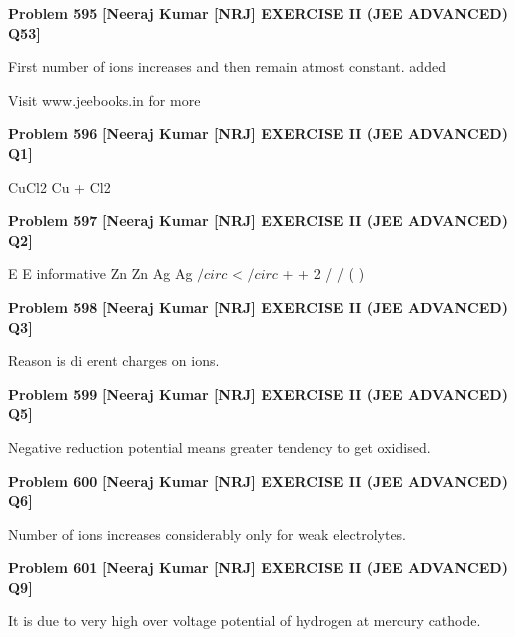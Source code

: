 \begin{problembox}
\textbf{Problem 595} \hfill \textbf{[Neeraj Kumar [NRJ] EXERCISE II (JEE ADVANCED) Q53]}
\label{q:ext-nrj_all_questions-595}

First number of ions increases and then remain 
atmost constant.
added
 
 
Visit www.jeebooks.in for more
\end{problembox}

\begin{problembox}
\textbf{Problem 596} \hfill \textbf{[Neeraj Kumar [NRJ] EXERCISE II (JEE ADVANCED) Q1]}
\label{q:ext-nrj_all_questions-596}

CuCl2 
 Cu + Cl2
\end{problembox}

\begin{problembox}
\textbf{Problem 597} \hfill \textbf{[Neeraj Kumar [NRJ] EXERCISE II (JEE ADVANCED) Q2]}
\label{q:ext-nrj_all_questions-597}

E
E
informative
Zn
Zn
Ag
Ag
$/circ$
<
$/circ$
+
+
2 /
/
(
)
\end{problembox}

\begin{problembox}
\textbf{Problem 598} \hfill \textbf{[Neeraj Kumar [NRJ] EXERCISE II (JEE ADVANCED) Q3]}
\label{q:ext-nrj_all_questions-598}

Reason is di  erent charges on ions.
\end{problembox}

\begin{problembox}
\textbf{Problem 599} \hfill \textbf{[Neeraj Kumar [NRJ] EXERCISE II (JEE ADVANCED) Q5]}
\label{q:ext-nrj_all_questions-599}

Negative reduction potential means greater 
tendency to get oxidised.
\end{problembox}

\begin{problembox}
\textbf{Problem 600} \hfill \textbf{[Neeraj Kumar [NRJ] EXERCISE II (JEE ADVANCED) Q6]}
\label{q:ext-nrj_all_questions-600}

Number of ions increases considerably only for 
weak electrolytes.
\end{problembox}

\begin{problembox}
\textbf{Problem 601} \hfill \textbf{[Neeraj Kumar [NRJ] EXERCISE II (JEE ADVANCED) Q9]}
\label{q:ext-nrj_all_questions-601}

It is due to very high over voltage potential of 
hydrogen at mercury cathode.
\end{problembox}

